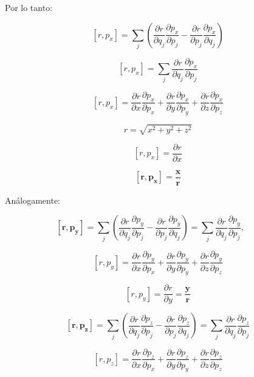\documentclass[]{article}
\begin{document}
Por lo tanto:

\[\left\lbrack r,p_{x} \right\rbrack = \sum_{j}^{}\left( \frac{\partial r}{\partial q_{j}}\frac{\partial p_{x}}{\partial p_{j}} - \frac{\partial r}{\partial p_{j}}\frac{\partial p_{x}}{\partial q_{j}} \right)\]

\[\left\lbrack r,p_{x} \right\rbrack = \sum_{j}^{}{\frac{\partial r}{\partial q_{j}}\frac{\partial p_{x}}{\partial p_{j}}}\]

\[\left\lbrack r,p_{x} \right\rbrack = \frac{\partial r}{\partial x}\frac{\partial p_{x}}{\partial p_{x}} + \frac{\partial r}{\partial y}\frac{\partial p_{x}}{\partial p_{y}} + \frac{\partial r}{\partial z}\frac{\partial p_{x}}{\partial p_{z}}\]

\[r = \sqrt{x^{2} + y^{2} + z^{2}}\]

\[\left\lbrack r,p_{x} \right\rbrack = \frac{\partial r}{\partial x}\]

\[\left\lbrack \mathbf{r,}\mathbf{p}_{\mathbf{x}} \right\rbrack\mathbf{=}\frac{\mathbf{x}}{\mathbf{r}}\]

Análogamente:

\[\left\lbrack \mathbf{r,}\mathbf{p}_{\mathbf{y}} \right\rbrack\mathbf{=}\sum_{j}^{}\left( \frac{\partial r}{\partial q_{j}}\frac{\partial p_{y}}{\partial p_{j}} - \frac{\partial r}{\partial p_{j}}\frac{\partial p_{y}}{\partial q_{j}} \right) = \sum_{j}^{}{\frac{\partial r}{\partial q_{j}}\frac{\partial p_{y}}{\partial p_{j}}}\mathbf{,\ \ \ \ \ \ \ \ }\]

\[\left\lbrack r,p_{y} \right\rbrack = \frac{\partial r}{\partial x}\frac{\partial p_{y}}{\partial p_{x}} + \frac{\partial r}{\partial y}\frac{\partial p_{y}}{\partial p_{y}} + \frac{\partial r}{\partial z}\frac{\partial p_{y}}{\partial p_{z}}\]

\[\left\lbrack r,p_{y} \right\rbrack = \frac{\partial r}{\partial y} = \frac{\mathbf{y}}{\mathbf{r}}\]

\[\left\lbrack \mathbf{r,}\mathbf{p}_{\mathbf{z}} \right\rbrack\mathbf{=}\sum_{j}^{}\left( \frac{\partial r}{\partial q_{j}}\frac{\partial p_{z}}{\partial p_{j}} - \frac{\partial r}{\partial p_{j}}\frac{\partial p_{z}}{\partial q_{j}} \right) = \sum_{j}^{}{\frac{\partial r}{\partial q_{j}}\frac{\partial p_{z}}{\partial p_{j}}}\]

\[\left\lbrack r,p_{z} \right\rbrack = \frac{\partial r}{\partial x}\frac{\partial p_{z}}{\partial p_{x}} + \frac{\partial r}{\partial y}\frac{\partial p_{z}}{\partial p_{y}} + \frac{\partial r}{\partial z}\frac{\partial p_{z}}{\partial p_{z}}\]
\end{document}
